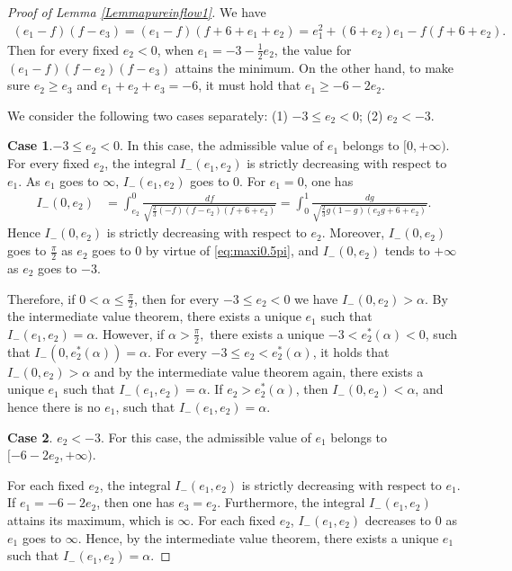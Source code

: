 \documentclass[reqno,12pt]{amsart}
\begin{document}
\begin{proof}[Proof of Lemma \ref{Lemmapureinflow1}] 
We have
\begin{align}\nonumber
    (e_1 -f ) (f - e_3) = (e_1 - f) (f+ 6 + e_1 + e_2) = 
    e_1^2 + (6+ e_2) e_1 - f(f+6 + e_2).
\end{align}
Then for every fixed $e_2 <0$,  when $e_1 = -3 - \frac12 e_2$, the  value for 
$(e_1 -f)(f- e_2)(f-e_3)$ attains the minimum. On the other hand, to make sure $e_2 \geq e_3$ and $e_1 + e_2 + e_3 = -6$, it must hold that 
$e_1 \geq - 6 - 2e_2. $

We consider the following two cases separately:
(1) $-3 \leq e_2 <0$; (2) $e_2<-3$. 

{\bf{Case 1}}.$-3 \leq e_2 <0$.
In this case, the admissible value of $e_1$ belongs to $[0,+\infty)$. For every fixed $e_2$, the integral $I_{-}(e_1, e_2)$ is strictly decreasing with respect to $e_1$. As $e_1$ goes to $\infty$, $I_{-}(e_1, e_2)$ goes to $0$.  For $e_1 = 0$, one has
\begin{align}\nonumber
  I_{-}(0, e_2) &=   \int_{e_2}^0 \frac{df}{\sqrt{\frac23 (-f) (f-e_2) (f+ 6+ e_2) }} 
  = \int_{0}^1 \frac{ dg}{\sqrt{\frac23 g(1-g)(e_2 g + 6 + e_2) }}. \nonumber
\end{align}
Hence
$I_{-}(0, e_2)$ is strictly decreasing with respect to $e_2$. Moreover, $I_{-}(0, e_2)$ goes to $\frac{\pi}{2}$ as $e_2$ goes to $0$ by virtue of \eqref{eq:maxi0.5pi}, and $I_{-}(0, e_2)$ tends to $+\infty$ as $e_2$ goes to $-3$. 

Therefore, if $0<\alpha \leq  \frac{\pi}{2}$, then for every $-3\leq e_2< 0$ we have $I_-(0, e_2) > \alpha. $ By the intermediate value theorem, there exists a unique $e_1 $ such that $I_{-}(e_1, e_2) = \alpha. $  However, if $\alpha > \frac{\pi}{2},$ there exists a unique $-3<e_2^*(\alpha)<0$, such that $I_{-}(0, e^*_2(\alpha) ) = \alpha$. For every $-3\leq e_2 < e_2^*(\alpha)$, it holds that $I_{-}(0, e_2) >\alpha$ and by the intermediate value theorem again, there exists a unique $e_1$ such that 
$I_{-}(e_1, e_2)= \alpha.$ If $e_2 > e_2^*(\alpha)$, then $I_{-}(0, e_2) < \alpha$, and hence there is no $e_1$, such that $I_{-}(e_1, e_2) =\alpha$. 

\vspace{2mm}
{\bf{Case 2}}. $e_2<-3$. For this case,  the admissible value of $e_1$ belongs to $[-6-2e_2,+\infty)$.

For each fixed $e_2$, the integral $I_{-}(e_1, e_2)$ is strictly decreasing with respect to $e_1$.  If $e_1= -6 -2e_2$, then one has $e_3 = e_2$. Furthermore, the integral $I_{-}(e_1, e_2)$ attains its maximum, which is $\infty$. For each fixed $e_2$, $I_{-}(e_1, e_2)$ decreases to $0$ as $e_1$ goes to $\infty$.  Hence, by the intermediate value theorem, there exists a unique $e_1$ such that $I_{-}(e_1, e_2) = \alpha$. 


\end{proof}
\end{document}
